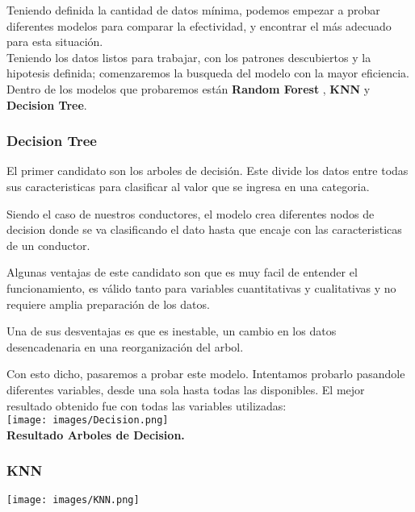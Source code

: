 \documentclass{article}
\begin{document}
        Teniendo definida la cantidad de datos mínima, podemos empezar a probar diferentes modelos para comparar la efectividad, y encontrar el más adecuado para esta situación. \\

        Teniendo los datos listos para trabajar, con los patrones descubiertos y la hipotesis definida; comenzaremos la busqueda del modelo con la mayor eficiencia. Dentro de los modelos que probaremos están \textbf{Random Forest} , \textbf{KNN} y \textbf{Decision Tree}.

        \subsubsection{Decision Tree}

            El primer candidato son los arboles de decisión. Este divide los datos entre todas sus caracteristicas para clasificar al valor que se ingresa en una categoria. 
            
            Siendo el caso de nuestros conductores, el modelo crea diferentes nodos de decision donde se va clasificando el dato hasta que encaje con las caracteristicas de un conductor. 

            Algunas ventajas de este candidato son que es muy facil de entender el funcionamiento, es válido tanto para variables cuantitativas y cualitativas y no requiere amplia preparación de los datos.

            Una de sus desventajas es que es inestable, un cambio en los datos desencadenaria en una reorganización del arbol.

            Con esto dicho, pasaremos a probar este modelo. Intentamos probarlo pasandole diferentes variables, desde una sola hasta todas las disponibles. El mejor resultado obtenido fue con todas las variables utilizadas: \\

            \texttt{[image: images/Decision.png]} \\

            \textbf{Resultado Arboles de Decision.} \\
            

        \subsubsection{KNN}

            \texttt{[image: images/KNN.png]} \\
    
\end{document}

